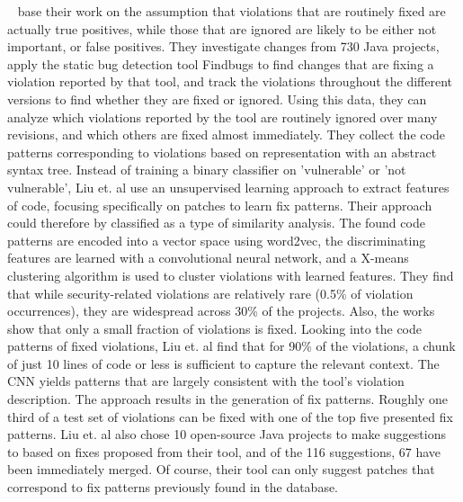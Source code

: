 \documentclass[
a4paper,
pagesize,
pdftex,
12pt,
twoside, %
BCOR=5mm, %
ngerman,
fleqn,
final,
]{scrartcl}
\begin{document}
	~\cite{Liu.2018} base their work on the assumption that violations that are routinely fixed are actually true positives, while those that are ignored are likely to be either not important, or false positives. They investigate changes from 730 Java projects, apply the static bug detection tool Findbugs to find changes that are fixing a violation reported by that tool, and track the violations throughout the different versions to find whether they are fixed or ignored. Using this data, they can analyze which violations reported by the tool are routinely ignored over many revisions, and which others are fixed almost immediately. They collect the code patterns corresponding to violations based on representation with an abstract syntax tree. Instead of training a binary classifier on 'vulnerable' or 'not vulnerable', Liu et. al use an unsupervised learning approach to extract features of code, focusing specifically on patches to learn fix patterns. Their approach could therefore by classified as a type of similarity analysis. The found code patterns are encoded into a vector space using word2vec, the discriminating features are learned with a convolutional neural network, and a X-means clustering algorithm is used to cluster violations with learned features. They find that while security-related violations are relatively rare (0.5\% of violation occurrences), they are widespread across 30\% of the projects. Also, the works show that only a small fraction of violations is fixed. Looking into the code patterns of fixed violations, Liu et. al find that for 90\% of the violations, a chunk of just 10 lines of code or less is sufficient to capture the relevant context. The CNN yields patterns that are largely consistent with the tool's violation description. The approach results in the generation of fix patterns. Roughly one third of a test set of violations can be fixed with one of the top five presented fix patterns. Liu et. al also chose 10 open-source Java projects to make suggestions to based on fixes proposed from their tool, and of the 116 suggestions, 67 have been immediately merged. Of course, their tool can only suggest patches that correspond to fix patterns previously found in the database. \\
\end{document}
